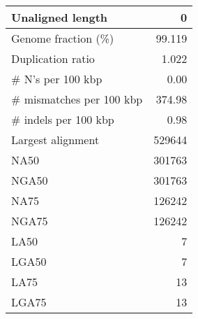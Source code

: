 \documentclass[12pt,a4paper]{article}
\begin{document}
\begin{table}[ht]
\begin{center}
\begin{tabular}{|l*{1}{|r}|}
Unaligned length & 0 \\ \hline
Genome fraction (\%) & 99.119 \\ \hline
Duplication ratio & 1.022 \\ \hline
\# N's per 100 kbp & 0.00 \\ \hline
\# mismatches per 100 kbp & 374.98 \\ \hline
\# indels per 100 kbp & 0.98 \\ \hline
Largest alignment & 529644 \\ \hline
NA50 & 301763 \\ \hline
NGA50 & 301763 \\ \hline
NA75 & 126242 \\ \hline
NGA75 & 126242 \\ \hline
LA50 & 7 \\ \hline
LGA50 & 7 \\ \hline
LA75 & 13 \\ \hline
LGA75 & 13 \\ \hline
\end{tabular}
\end{center}
\end{table}
\end{document}
